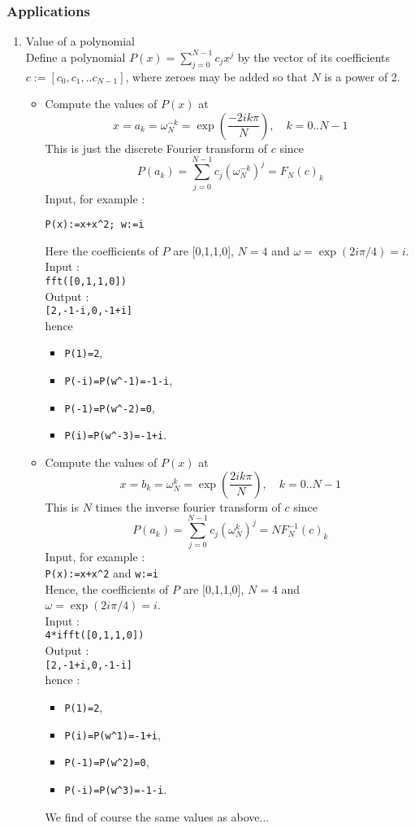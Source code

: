 \documentclass[a4paper,11pt]{book}
\begin{document}
\subsubsection{Applications}
\begin{enumerate}
\item Value of a polynomial\\ 
Define a polynomial $P(x)=\sum_{j=0}^{N-1}c_jx^j$ by the vector of its 
coefficients $c:=[c_0,c_1,..c_{N-1}]$, where zeroes may be added so that
$N$ is a power of 2.
\begin{itemize}
\item Compute the values of $P(x)$ at
\[ x=a_k=\omega_N^{-k}=\exp(\frac{-2ik\pi}{N}), \quad k=0..N-1 \]
This is just the discrete Fourier transform of $c$ since
\[ P(a_k)=\sum_{j=0}^{N-1}c_j(\omega_N^{-k})^j=F_N(c)_k \]
Input, for example :
\begin{center}
{\tt P(x):=x+x\verb|^|2;  w:=i}
\end{center}
Here the coefficients of $P$ are [0,1,1,0],  
$N=4$ and $\omega=\exp(2i\pi/4)=i$.\\
Input :\\
{\tt fft([0,1,1,0])}\\
Output :\\
{\tt [2,-1-i,0,-1+i]}\\
hence 
\begin{itemize}
\item {\tt P(1)=2},
\item {\tt P(-i)=P(w\verb|^|-1)=-1-i},
\item {\tt P(-1)=P(w\verb|^|-2)=0},
\item {\tt P(i)=P(w\verb|^|-3)=-1+i}.
\end{itemize}

\item Compute the values of $P(x)$ at
\[ x=b_k=\omega_N^{k}=\exp(\frac{2ik\pi}{N}), \quad k=0..N-1 \]
This is $N$ times the inverse fourier transform of $c$ since
\[ P(a_k)=\sum_{j=0}^{N-1}c_j(\omega_N^{k})^j=NF_N^{-1}(c)_k \]
Input, for example :\\
{\tt P(x):=x+x\verb|^|2} and {\tt w:=i}\\
Hence, the coefficients of $P$ are [0,1,1,0], 
$N=4$ and $\omega=\exp(2i\pi/4)=i$.\\
Input :\\
{\tt 4*ifft([0,1,1,0])}\\
Output :\\
{\tt [2,-1+i,0,-1-i]}\\
hence : \begin{itemize}
\item {\tt P(1)=2},
\item {\tt  P(i)=P(w\verb|^|1)=-1+i},
\item {\tt  P(-1)=P(w\verb|^|2)=0},
\item {\tt  P(-i)=P(w\verb|^|3)=-1-i}.
\end{itemize}
We find of course the same values as above...
\end{itemize}


\end{enumerate}
\end{document}
